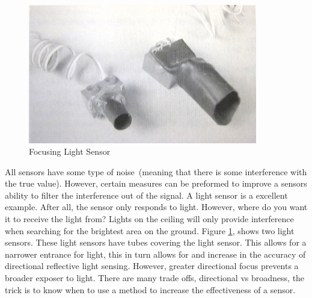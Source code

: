 \vspace*{.2in}
\begin{figure}[h!]
\begin{center}
\leavevmode
\includegraphics[width=100mm]{IMG_0005.JPG}
\end{center}
\caption{Focusing Light Sensor~\cite{RoboticExplorations} }
\label{fig:LightFocus}
\end{figure}

 All sensors have some type of noise~(meaning that there is some interference with the true value).  However, certain measures can be preformed to improve a sensors ability to filter the interference out of the signal.  A light sensor is a excellent example.  After all, the sensor only responds to light.  However, where do you want it to receive the light from?  Lights on the ceiling will only provide interference when searching for the brightest area on the ground\cite{RoboticExplorations}.  Figure \ref{fig:LightFocus}, shows two light sensors.  These light sensors have tubes covering the light sensor.  This allows for a narrower entrance for light,  this in turn allows for and increase in the accuracy of directional reflective light sensing.   However, greater directional focus prevents a broader exposer to light.  There are many trade offs, directional vs broadness, the trick is to know when to use a method to increase the effectiveness of a sensor.\cite{RoboticExplorations}